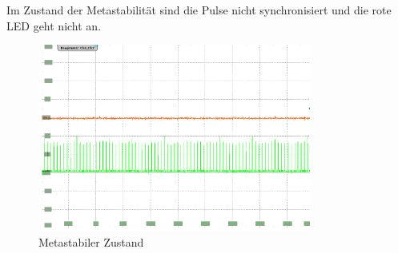 \newpage
Im Zustand der Metastabilität sind die Pulse nicht synchronisiert und die rote LED geht nicht an.

\begin{figure}[H]
	\includegraphics[width=0.8\textwidth]{images/metastability/asynchron_en_.png}
	\caption{Metastabiler Zustand}
	\label{fig.metastabil.Metastabil}
\end{figure}

